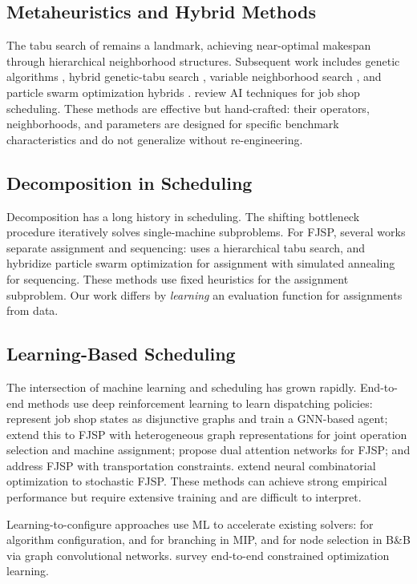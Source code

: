 \documentclass[12pt]{article}
\begin{document}
\subsection{Metaheuristics and Hybrid Methods}
The tabu search of \citet{Mastrolilli2000} remains a landmark, achieving near-optimal makespan through hierarchical neighborhood structures. Subsequent work includes genetic algorithms \citep{Pezzella2008}, hybrid genetic-tabu search \citep{Li2016}, variable neighborhood search \citep{Gao2008}, and particle swarm optimization hybrids \citep{Xia2005}. \citet{Calis2015} review AI techniques for job shop scheduling. These methods are effective but hand-crafted: their operators, neighborhoods, and parameters are designed for specific benchmark characteristics and do not generalize without re-engineering.

\subsection{Decomposition in Scheduling}
Decomposition has a long history in scheduling. The shifting bottleneck procedure \citep{Adams1988} iteratively solves single-machine subproblems. For FJSP, several works separate assignment and sequencing: \citet{Brandimarte1993} uses a hierarchical tabu search, and \citet{Xia2005} hybridize particle swarm optimization for assignment with simulated annealing for sequencing. These methods use fixed heuristics for the assignment subproblem. Our work differs by \emph{learning} an evaluation function for assignments from data.

\subsection{Learning-Based Scheduling}
The intersection of machine learning and scheduling has grown rapidly. End-to-end methods use deep reinforcement learning to learn dispatching policies: \citet{Zhang2020drl} represent job shop states as disjunctive graphs and train a GNN-based agent; \citet{Song2023} extend this to FJSP with heterogeneous graph representations for joint operation selection and machine assignment; \citet{Wang2024} propose dual attention networks for FJSP; and \citet{Moon2024learning} address FJSP with transportation constraints. \citet{Smit2024nco} extend neural combinatorial optimization to stochastic FJSP. These methods can achieve strong empirical performance but require extensive training and are difficult to interpret.

Learning-to-configure approaches use ML to accelerate existing solvers: \citet{Hutter2011} for algorithm configuration, \citet{He2014} and \citet{Khalil2016} for branching in MIP, and \citet{Gasse2019} for node selection in B\&B via graph convolutional networks. \citet{Kotary2021} survey end-to-end constrained optimization learning.
\end{document}
